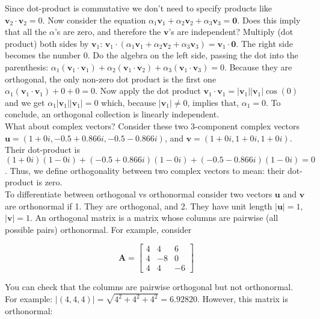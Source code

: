 \documentclass[main.tex]{subfiles}
\begin{document}
    Since dot-product is commutative we don't need to specify products like $\mathbf{v}_{2} \cdot \mathbf{v}_{2}=0$. Now consider the equation $\alpha_{1} \mathbf{v}_{1}+\alpha_{2} \mathbf{v}_{2}+\alpha_{3} \mathbf{v}_{3}=\mathbf{0}$. Does this imply that all the $\alpha$'s are zero, and therefore the $\mathbf{v}$'s are independent? Multiply (dot product) both sides by $\mathbf{v}_1$: $\mathbf{v}_{1} \cdot\left(\alpha_{1} \mathbf{v}_{1}+\alpha_{2} \mathbf{v}_{2}+\alpha_{3} \mathbf{v}_{3}\right)=\mathbf{v}_{1} \cdot \mathbf{0}$. The right side becomes the number 0. Do the algebra on the left side, passing the dot into the parenthesis: $\alpha_{1}\left(\mathbf{v}_{1} \cdot \mathbf{v}_{1}\right)+\alpha_{2}\left(\mathbf{v}_{1} \cdot \mathbf{v}_{2}\right)+\alpha_{3}\left(\mathbf{v}_{1} \cdot \mathbf{v}_{3}\right)=0$. Because they are orthogonal, the only non-zero dot product is the first one $\alpha_{1}\left(\mathbf{v}_{1} \cdot \mathbf{v}_{1}\right)+0+0=0$. Now apply the dot product $\mathbf{v}_{1} \cdot \mathbf{v}_{1}=\left|\mathbf{v}_{1}\right|\left|\mathbf{v}_{1}\right| \cos (0)$ and we get $\alpha_{1}\left|\mathbf{v}_{1}\right|\left|\mathbf{v}_{1}\right|=0$ which, because $\left|\mathbf{v}_{1}\right| \neq 0$, implies that, $\alpha_{1}=0$. To conclude, an orthogonal collection is linearly independent.\\
    
    What about complex vectors? Consider these two 3-component complex vectors $\mathbf{u}=(1+0 i,-0.5+0.866 i,-0.5-0.866 i)$, and $\mathbf{v}=(1+0 i, 1+0 i, 1+0 i)$. Their dot-product is $(1+0 i)(1-0 i)+(-0.5+0.866 i)(1-0 i)+(-0.5-0.866 i)(1-0 i)=0$. Thus, we define orthogonality between two complex vectors to mean: their dot-product is zero.\\
    
    To differentiate between orthogonal vs orthonormal consider two vectors $\mathbf{u}$ and $\mathbf{v}$ are orthonormal if 1. They are orthogonal, and 2. They have unit length $|\mathbf{u}|=1$, $|\mathbf{v}|=1$. An orthogonal matrix is a matrix whose columns are pairwise (all possible pairs) orthonormal. For example, consider 
    
    $$
    \mathbf{A}=\left[\begin{array}{ccc}
    4 & 4 & 6 \\
    4 & -8 & 0 \\
    4 & 4 & -6
    \end{array}\right]
    $$
    
    You can check that the columns are pairwise orthogonal but not orthonormal. For example: $|(4,4,4)|=\sqrt{4^{2}+4^{2}+4^{2}}=6.92820$. However, this matrix is orthonormal: 
    
\end{document}
